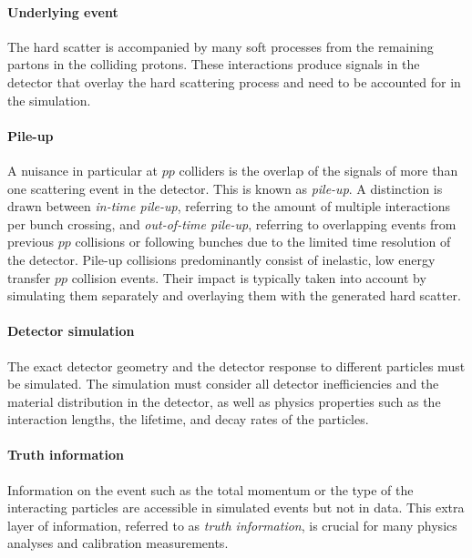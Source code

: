 \paragraph{Underlying event}
The hard scatter is accompanied by many soft processes from the remaining partons in the colliding protons. These interactions produce signals in the detector that overlay the hard scattering process and need to be accounted for in the simulation.
\paragraph{Pile-up}
A nuisance in particular at $pp$ colliders is the overlap of the signals of more than one scattering event in the detector. This is known as \emph{pile-up}. A distinction is drawn between \emph{in-time pile-up}, referring to the amount of multiple interactions per bunch crossing, and \emph{out-of-time pile-up}, referring to overlapping events from previous $pp$ collisions or following bunches due to the limited time resolution of the detector.
Pile-up collisions predominantly consist of inelastic, low energy transfer $pp$ collision events. 
Their impact is typically taken into account by simulating them separately and overlaying them with the generated hard scatter.
\paragraph{Detector simulation}
The exact detector geometry and the detector response to different particles must be simulated.
The simulation must consider all detector inefficiencies and the material distribution in the detector, as well as physics properties such as the interaction lengths, the lifetime, and decay rates of the particles.

\paragraph{Truth information}
Information on the event such as the total momentum or the type of the interacting particles are accessible in simulated events but not in data. This extra layer of information, referred to as \emph{truth information}, is crucial for many physics analyses and calibration measurements.

